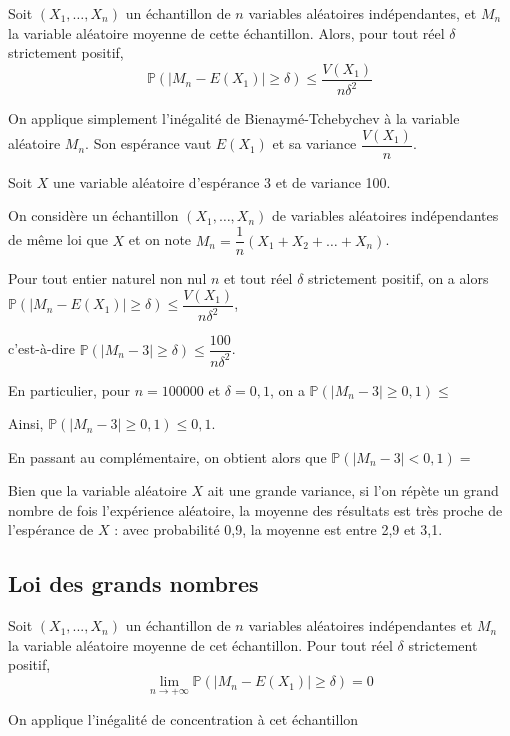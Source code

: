 \documentclass[11pt,fleqn, openany]{book} %
\begin{document}
\begin{proposition} Soit $(X_1,\ldots,X_n)$ un échantillon de $n$ variables aléatoires indépendantes, et $M_n$ la variable aléatoire moyenne de cette échantillon. Alors, pour tout réel $\delta$ strictement positif,
\[ \mathbb{P}(|M_n-E(X_1)|\geqslant \delta ) \leqslant \dfrac{V(X_1)}{n\delta^2}\]\end{proposition}

\begin{demonstration} On applique simplement l'inégalité de Bienaymé-Tchebychev à la variable aléatoire $M_n$. Son espérance vaut $E(X_1)$ et sa variance $\dfrac{V(X_1)}{n}$.\end{demonstration}

\begin{example} Soit $X$ une variable aléatoire d'espérance 3 et de variance 100.

 On considère un échantillon $(X_1, \ldots, X_n)$ de variables aléatoires indépendantes de même loi que $X$ et on note $M_n = \dfrac{1}{n} (X_1+X_2+\ldots + X_n)$.

Pour tout entier naturel non nul $n$ et tout réel $\delta$ strictement positif, on a alors $\mathbb{P}(|M_n-E(X_1)|\geqslant \delta ) \leqslant \dfrac{V(X_1)}{n\delta ^2}$,

c'est-à-dire $\mathbb{P}(|M_n-3|\geqslant \delta ) \leqslant \dfrac{100}{n \delta ^2}$.

En particulier, pour $n=100000$ et $\delta=0,1$, on a $\mathbb{P}(|M_n-3|\geqslant 0,1 ) \leqslant $

Ainsi, $\mathbb{P}(|M_n-3|\geqslant 0,1 ) \leqslant 0,1$.

En passant au complémentaire, on obtient alors que $\mathbb{P}(|M_n-3| < 0,1 ) =$

Bien que la variable aléatoire $X$ ait une grande variance, si l'on répète un grand nombre de fois l'expérience aléatoire, la moyenne des résultats est très proche de l'espérance de $X$ : avec probabilité 0,9, la moyenne est entre 2,9 et 3,1.\end{example}


\subsection{Loi des grands nombres}

\begin{theorem} Soit $(X_1,...,X_n)$ un échantillon de $n$ variables aléatoires indépendantes et $M_n$ la variable aléatoire moyenne de cet échantillon. Pour tout réel $\delta$ strictement positif,
\[ \displaystyle \lim_{n \to + \infty} \mathbb{P}(|M_n-E(X_1)|\geqslant \delta )=0\]\end{theorem}

\begin{demonstration}On applique l'inégalité de concentration à cet échantillon
\vskip100pt
\end{demonstration}
\end{document}
